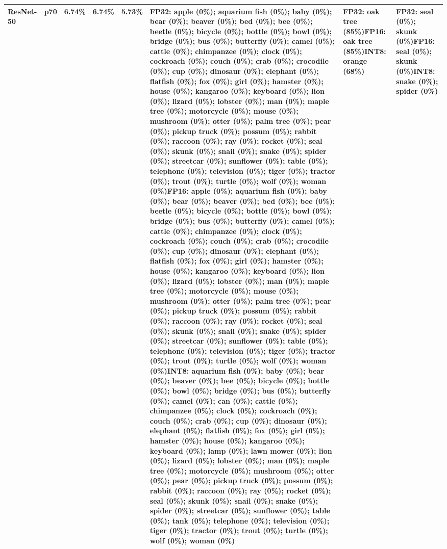 \begin{longtable}{p{2.8cm} r r r r p{5.0cm} p{4.2cm} p{4.2cm}}
ResNet-50 & p70 & 6.74\% & 6.74\% & 5.73\% & FP32: apple (0\%); aquarium fish (0\%); baby (0\%); bear (0\%); beaver (0\%); bed (0\%); bee (0\%); beetle (0\%); bicycle (0\%); bottle (0\%); bowl (0\%); bridge (0\%); bus (0\%); butterfly (0\%); camel (0\%); cattle (0\%); chimpanzee (0\%); clock (0\%); cockroach (0\%); couch (0\%); crab (0\%); crocodile (0\%); cup (0\%); dinosaur (0\%); elephant (0\%); flatfish (0\%); fox (0\%); girl (0\%); hamster (0\%); house (0\%); kangaroo (0\%); keyboard (0\%); lion (0\%); lizard (0\%); lobster (0\%); man (0\%); maple tree (0\%); motorcycle (0\%); mouse (0\%); mushroom (0\%); otter (0\%); palm tree (0\%); pear (0\%); pickup truck (0\%); possum (0\%); rabbit (0\%); raccoon (0\%); ray (0\%); rocket (0\%); seal (0\%); skunk (0\%); snail (0\%); snake (0\%); spider (0\%); streetcar (0\%); sunflower (0\%); table (0\%); telephone (0\%); television (0\%); tiger (0\%); tractor (0\%); trout (0\%); turtle (0\%); wolf (0\%); woman (0\%)\newline FP16: apple (0\%); aquarium fish (0\%); baby (0\%); bear (0\%); beaver (0\%); bed (0\%); bee (0\%); beetle (0\%); bicycle (0\%); bottle (0\%); bowl (0\%); bridge (0\%); bus (0\%); butterfly (0\%); camel (0\%); cattle (0\%); chimpanzee (0\%); clock (0\%); cockroach (0\%); couch (0\%); crab (0\%); crocodile (0\%); cup (0\%); dinosaur (0\%); elephant (0\%); flatfish (0\%); fox (0\%); girl (0\%); hamster (0\%); house (0\%); kangaroo (0\%); keyboard (0\%); lion (0\%); lizard (0\%); lobster (0\%); man (0\%); maple tree (0\%); motorcycle (0\%); mouse (0\%); mushroom (0\%); otter (0\%); palm tree (0\%); pear (0\%); pickup truck (0\%); possum (0\%); rabbit (0\%); raccoon (0\%); ray (0\%); rocket (0\%); seal (0\%); skunk (0\%); snail (0\%); snake (0\%); spider (0\%); streetcar (0\%); sunflower (0\%); table (0\%); telephone (0\%); television (0\%); tiger (0\%); tractor (0\%); trout (0\%); turtle (0\%); wolf (0\%); woman (0\%)\newline INT8: aquarium fish (0\%); baby (0\%); bear (0\%); beaver (0\%); bee (0\%); bicycle (0\%); bottle (0\%); bowl (0\%); bridge (0\%); bus (0\%); butterfly (0\%); camel (0\%); can (0\%); cattle (0\%); chimpanzee (0\%); clock (0\%); cockroach (0\%); couch (0\%); crab (0\%); cup (0\%); dinosaur (0\%); elephant (0\%); flatfish (0\%); fox (0\%); girl (0\%); hamster (0\%); house (0\%); kangaroo (0\%); keyboard (0\%); lamp (0\%); lawn mower (0\%); lion (0\%); lizard (0\%); lobster (0\%); man (0\%); maple tree (0\%); motorcycle (0\%); mushroom (0\%); otter (0\%); pear (0\%); pickup truck (0\%); possum (0\%); rabbit (0\%); raccoon (0\%); ray (0\%); rocket (0\%); seal (0\%); skunk (0\%); snail (0\%); snake (0\%); spider (0\%); streetcar (0\%); sunflower (0\%); table (0\%); tank (0\%); telephone (0\%); television (0\%); tiger (0\%); tractor (0\%); trout (0\%); turtle (0\%); wolf (0\%); woman (0\%) & FP32: oak tree (85\%)\newline FP16: oak tree (85\%)\newline INT8: orange (68\%) & FP32: seal (0\%); skunk (0\%)\newline FP16: seal (0\%); skunk (0\%)\newline INT8: snake (0\%); spider (0\%) \\ \hline

\end{longtable}
